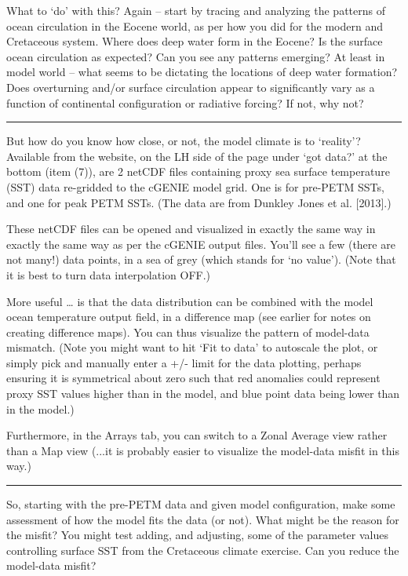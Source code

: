 \documentclass[11pt,fleqn]{book} %
\begin{document}
\noindent What to ‘do’ with this? Again – start by tracing and analyzing the patterns of ocean circulation in the Eocene world, as per how you did for the modern and Cretaceous system. Where does deep water form in the Eocene? Is the surface ocean circulation as expected?
Can you see any patterns emerging? At least in model world – what seems to be dictating the locations of deep water formation? Does overturning and/or surface circulation appear to significantly vary as a function of continental configuration or radiative forcing? If not, why not?

\vspace{1mm}
\noindent\rule{4cm}{0.1mm}
\vspace{2mm}

\noindent But how do you know how close, or not, the model climate is to ‘reality’?
Available from the website, on the LH side of the page under ‘got data?’ at the bottom (item (7)), are 2 netCDF files containing proxy sea surface temperature (SST) data re-gridded to the cGENIE model grid. One is for pre-PETM SSTs, and one for peak PETM SSTs. (The data are from Dunkley Jones et al. [2013].)

These netCDF files can be opened and visualized in exactly the same way in exactly the same way as per the cGENIE output files. You’ll see a few (there are not many!) data points, in a sea of grey (which stands for ‘no value’). (Note that it is best to turn data interpolation OFF.)

More useful … is that the data distribution can be combined with the model ocean temperature output field, in a difference map (see earlier for notes on creating difference maps). You can thus visualize the pattern of model-data mismatch. (Note you might want to hit ‘Fit to data’ to autoscale the plot, or simply pick and manually enter a +/- limit for the data plotting, perhaps ensuring it is symmetrical about zero such that red anomalies could represent proxy SST values higher than in the model, and blue point data being lower than in the model.)

Furthermore, in the Arrays tab, you can switch to a Zonal Average view rather than a Map view (...it is probably easier to visualize the model-data misfit in this way.)

\vspace{1mm}
\noindent\rule{4cm}{0.1mm}
\vspace{2mm}

\noindent So, starting with the pre-PETM data and given model configuration, make some assessment of how the model fits the data (or not). What might be the reason for the misfit? You might test adding, and adjusting, some of the parameter values controlling surface SST from the Cretaceous climate exercise. Can you reduce the model-data misfit?
\end{document}
